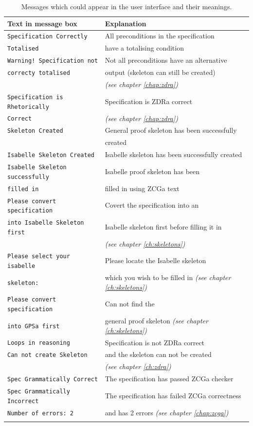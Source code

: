 {\def\arraystretch{0.5}\tabcolsep=0.5pt
\begin{longtable}[H]{|l | l |}
\hline
\textbf{Text in message box} & \textbf{Explanation} \\
\hline
\hline
\verb|Specification Correctly| & All preconditions in the specification\\
\verb|Totalised| & have a totalising condition  \\
\hline
\verb|Warning! Specification not| & Not all preconditions have an alternative \\
\verb|correcty totalised| & output (skeleton can still be created) \\
& \textit{(see chapter \ref{chap:zdra})} \\
\hline
\verb|Specification is Rhetorically| & Specification is ZDRa correct \\
\verb|Correct| & \textit{(see chapter \ref{chap:zdra})} \\
\hline
\verb|Skeleton Created| & General proof skeleton has been successfully \\
& created \\
\hline
\verb|Isabelle Skeleton Created| & Isabelle skeleton has been successfully
created \\
\hline
\verb|Isabelle Skeleton successfully| & Isabelle proof skeleton has been \\
\verb|filled in| & filled in using ZCGa text \\
\hline
\verb|Please convert specification| & Covert the specification into an  \\
\verb|into Isabelle Skeleton first| & Isabelle skeleton first before filling it
in \\
& \textit{(see chapter \ref{ch:skeletons})} \\
\hline
\verb|Please select your isabelle| & Please locate the Isabelle skeleton\\
\verb|skeleton:| & which you wish to be filled in \textit{(see chapter
\ref{ch:skeletons})}\\
\hline
\verb|Please convert specification| & Can not find the \\
\verb|into GPSa first| & general proof skeleton \textit{(see chapter
\ref{ch:skeletons})}\\
\hline
\verb|Loops in reasoning| & Specification is not ZDRa correct \\
\verb|Can not create Skeleton| & and the skeleton can not be created \\
& \textit{(see chapter \ref{ch:zdra})}\\
\hline
\verb|Spec Grammatically Correct| & The specification has passed ZCGa checker \\
\hline
\verb|Spec Grammatically Incorrect|& The specification has failed ZCGa
correctness\\
\verb|Number of errors: 2| & and has 2 errors \textit{(see chapter
\ref{chap:zcga})}\\
\hline
\caption{Messages which could appear in the user interface and their meanings.}
\label{tab:uimessages}
\end{longtable}
}

